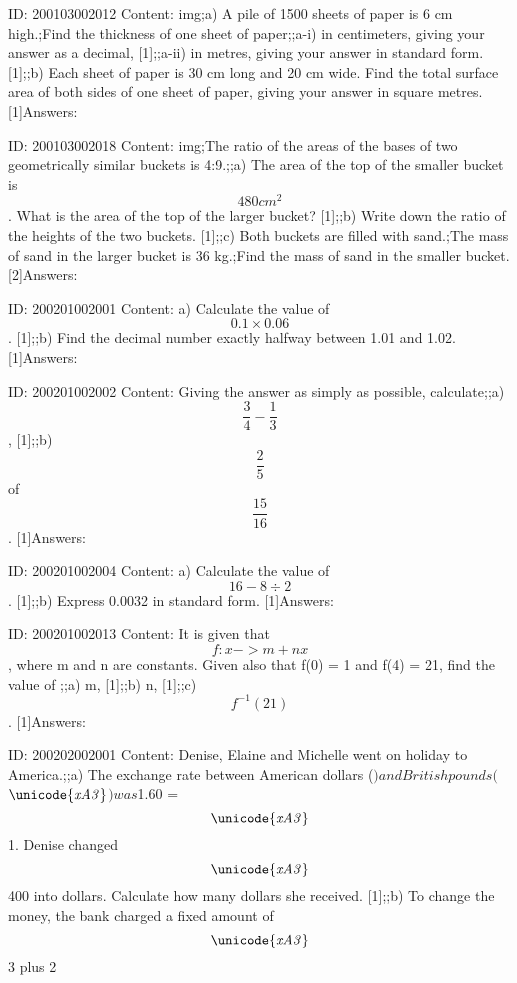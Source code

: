 \documentclass{article}
\begin{document}
ID: 200103002012
Content:
img;a) A pile of 1500 sheets of paper is 6 cm high.;Find the thickness of one sheet of paper;;a-i) in centimeters, giving your answer as a decimal,    [1];;a-ii) in metres, giving your answer in standard form.    [1];;b) Each sheet of paper is 30 cm long and 20 cm wide. Find the total surface area of both sides of one sheet of paper, giving your answer in square metres.    [1]Answers:

ID: 200103002018
Content:
img;The ratio of the areas of the bases of two geometrically similar buckets is 4:9.;;a) The area of the top of the smaller bucket is $$480cm^2$$. What is the area of the top of the larger bucket?    [1];;b) Write down the ratio of the heights of the two buckets.    [1];;c) Both buckets are filled with sand.;The mass of sand in the larger bucket is 36 kg.;Find the mass of sand in the smaller bucket.    [2]Answers:

ID: 200201002001
Content:
a) Calculate the value of $$0.1 \times 0.06$$. [1];;b) Find the decimal number exactly halfway between 1.01 and 1.02. [1]Answers:

ID: 200201002002
Content:
Giving the answer as simply as possible, calculate;;a) $$\frac{3}{4}-\frac{1}{3}$$, [1];;b) $$\frac{2}{5}$$ of  $$\frac{15}{16}$$. [1]Answers:

ID: 200201002004
Content:
a) Calculate the value of $$16-8\div 2$$. [1];;b) Express 0.0032 in standard form. [1]Answers:

ID: 200201002013
Content:
It is given that $$f:x->m+nx$$, where m and n are constants. Given also that f(0) = 1 and f(4) = 21, find the value of ;;a) m, [1];;b) n, [1];;c) $$f^{-1}(21)$$. [1]Answers:

ID: 200202002001
Content:
Denise, Elaine and Michelle went on holiday to America.;;a) The exchange rate between American dollars ($) and British pounds ($$\it\unicode{xA3}$$) was $1.60 = $$\it\unicode{xA3}$$1. Denise changed $$\it\unicode{xA3}$$400 into dollars. Calculate how many dollars she received. [1];;b) To change the money, the bank charged a fixed amount of $$\it\unicode{xA3}$$3 plus 2%
\end{document}
